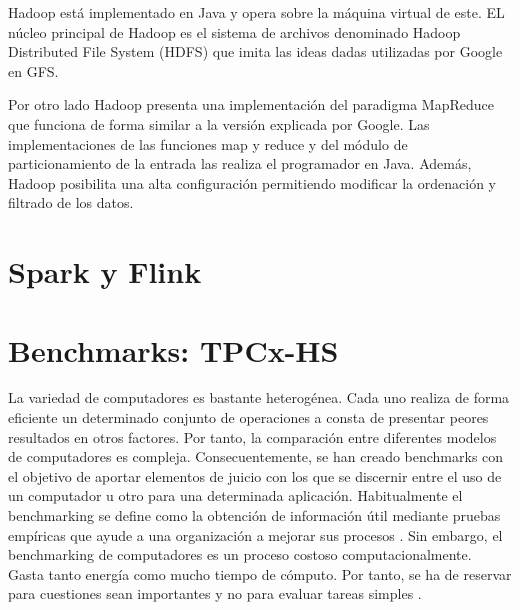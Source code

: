 \documentclass[10pt]{article}
\begin{document}
		Hadoop está implementado en Java y opera sobre la máquina virtual de este. EL núcleo principal de Hadoop es el sistema de archivos denominado Hadoop Distributed File System (HDFS) que imita las ideas dadas utilizadas por Google en GFS.
		
		Por otro lado Hadoop presenta una implementación del paradigma MapReduce que funciona de forma similar a la versión explicada por Google. Las implementaciones de las funciones map y reduce y del módulo de particionamiento de la entrada las realiza el programador en Java. Además, Hadoop posibilita una alta configuración permitiendo modificar la ordenación y filtrado de los datos.


\section{Spark y Flink} \label{sec:spark-flink}



\section{Benchmarks: TPCx-HS} \label{sec:tpcx-hs}

	La variedad de computadores es bastante heterogénea. Cada uno realiza de forma eficiente un determinado conjunto de operaciones a consta de presentar peores resultados en otros factores. Por tanto, la comparación entre diferentes modelos de computadores es compleja. Consecuentemente, se han creado benchmarks con el objetivo de aportar elementos de juicio con los que se discernir entre el uso de un computador u otro para una determinada aplicación. Habitualmente el benchmarking se define como la obtención de información útil mediante pruebas empíricas que ayude a una organización a mejorar sus procesos \cite{benchmarking}. Sin embargo, el benchmarking de computadores es un proceso costoso computacionalmente. Gasta tanto energía como mucho tiempo de cómputo. Por tanto, se ha de reservar para cuestiones sean importantes y no para evaluar tareas simples \cite{desv-bench}.
	
\end{document}
